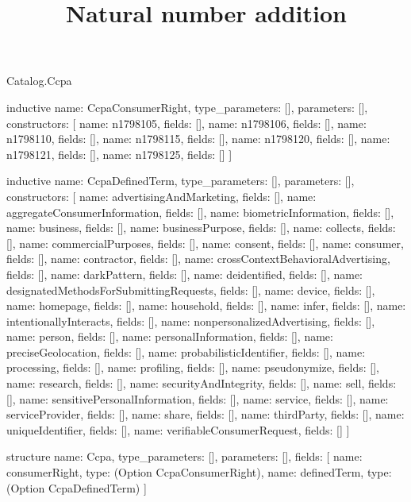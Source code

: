 \begin{lexlean}{Catalog.Ccpa}
\title{Natural number addition}
\begin{semanticmodule}
inductive{
  name: CcpaConsumerRight,
  type_parameters: [],
  parameters: [],
  constructors: [
    {name: n1798105, fields: []},
    {name: n1798106, fields: []},
    {name: n1798110, fields: []},
    {name: n1798115, fields: []},
    {name: n1798120, fields: []},
    {name: n1798121, fields: []},
    {name: n1798125, fields: []}
  ]
}

inductive{
  name: CcpaDefinedTerm,
  type_parameters: [],
  parameters: [],
  constructors: [
    {name: advertisingAndMarketing, fields: []},
    {name: aggregateConsumerInformation, fields: []},
    {name: biometricInformation, fields: []},
    {name: business, fields: []},
    {name: businessPurpose, fields: []},
    {name: collects, fields: []},
    {name: commercialPurposes, fields: []},
    {name: consent, fields: []},
    {name: consumer, fields: []},
    {name: contractor, fields: []},
    {name: crossContextBehavioralAdvertising, fields: []},
    {name: darkPattern, fields: []},
    {name: deidentified, fields: []},
    {name: designatedMethodsForSubmittingRequests, fields: []},
    {name: device, fields: []},
    {name: homepage, fields: []},
    {name: household, fields: []},
    {name: infer, fields: []},
    {name: intentionallyInteracts, fields: []},
    {name: nonpersonalizedAdvertising, fields: []},
    {name: person, fields: []},
    {name: personalInformation, fields: []},
    {name: preciseGeolocation, fields: []},
    {name: probabilisticIdentifier, fields: []},
    {name: processing, fields: []},
    {name: profiling, fields: []},
    {name: pseudonymize, fields: []},
    {name: research, fields: []},
    {name: securityAndIntegrity, fields: []},
    {name: sell, fields: []},
    {name: sensitivePersonalInformation, fields: []},
    {name: service, fields: []},
    {name: serviceProvider, fields: []},
    {name: share, fields: []},
    {name: thirdParty, fields: []},
    {name: uniqueIdentifier, fields: []},
    {name: verifiableConsumerRequest, fields: []}
  ]
}

structure{
  name: Ccpa,
  type_parameters: [],
  parameters: [],
  fields: [
    {name: consumerRight, type: (Option CcpaConsumerRight)},
    {name: definedTerm, type: (Option CcpaDefinedTerm)}
  ]
}
\end{semanticmodule}
\end{lexlean}
